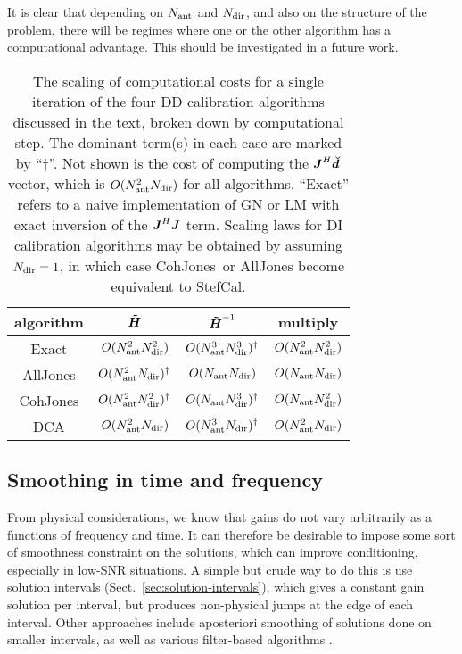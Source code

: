 \documentclass[useAMS,usenatbib]{mn2e}
\newcommand{\mat}[1]{{\bmath{#1}}}
\newcommand{\JJ}{\mat{J}} %
\newcommand{\HHa}{\mat{\tilde{H}}} %
\newcommand{\JHJ}{\JJ^H\JJ} %
\newcommand{\AUG}[1]{\bmath{\breve{#1}}}
\newcommand{\Dd}{\AUG{d}}
\newcommand{\COH}{{\sc CohJones}}
\newcommand{\StefCal}{{\sc StefCal}}
\begin{document}
It is clear that depending on $N_\mathrm{ant}$ and $N_\mathrm{dir}$, and also on the structure of the problem, there will be 
regimes where one or the other algorithm has a computational advantage. This should be investigated in a future work.


\begin{table}
\begin{tabular}{c|ccc}
algorithm & $\HHa$ & $\HHa^{-1}$ & multiply \\
\hline
Exact          & $O(N_\mathrm{ant}^2N_\mathrm{dir}^2)$ & $O(N_\mathrm{ant}^3N_\mathrm{dir}^3)^\dagger$ &  $O(N_\mathrm{ant}^2N_\mathrm{dir}^2)$ \\ 
{\sc AllJones} & $O(N_\mathrm{ant}^2N_\mathrm{dir})^\dagger$   & $O(N_\mathrm{ant}N_\mathrm{dir})$     &  $O(N_\mathrm{ant}N_\mathrm{dir})$ \\
\COH           & $O(N_\mathrm{ant}^2N_\mathrm{dir}^2)^\dagger$ & $O(N_\mathrm{ant}N_\mathrm{dir}^3)^\dagger$   &  $O(N_\mathrm{ant}N_\mathrm{dir}^2)$ \\
DCA            & $O(N_\mathrm{ant}^2N_\mathrm{dir})$   & $O(N_\mathrm{ant}^3N_\mathrm{dir})^\dagger$   &  $O(N_\mathrm{ant}^2N_\mathrm{dir})$ \\
\hline
\end{tabular}
\caption{\label{tab:costs}The scaling of computational costs for a single iteration of the 
four DD calibration algorithms discussed in the text, broken down by computational step. 
The dominant term(s) in each case are marked by ``$\dagger$''. Not shown is the cost of computing the $\JJ^H\Dd$ 
vector, which is $O(N_\mathrm{ant}^2N_\mathrm{dir})$ for all algorithms. ``Exact'' refers to a naive implementation of GN or LM with exact 
inversion of the $\JHJ$ term. Scaling laws for DI calibration algorithms may be obtained by assuming $N_\mathrm{dir}=1$, in which
case \COH\ or {\sc AllJones} become equivalent to \StefCal. 
}
\end{table}

\subsection{Smoothing in time and frequency}
\label{sec:DI:smooth}

From physical considerations, we know that gains do not vary arbitrarily as a functions of frequency and time. It can
therefore be desirable to impose some sort of smoothness constraint on the solutions, which can improve conditioning, especially
in low-SNR situations. A simple but crude way to do this is use solution intervals (Sect.~\ref{sec:solution-intervals}),
which gives a constant gain solution per interval, but produces non-physical jumps at the edge of each interval.
Other approaches include aposteriori smoothing of solutions done on smaller intervals, as well as various filter-based 
algorithms \citep{tasse-filters}. 
\end{document}
